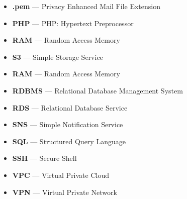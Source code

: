 \begin{itemize}
    \item  \textbf{.pem} \tab— Privacy Enhanced Mail File Extension
    \item  \textbf{PHP} \tab— PHP: Hypertext Preprocessor
    \item  \textbf{RAM} \tab— Random Access Memory
    \item  \textbf{S3} \tab— Simple Storage Service
    \item  \textbf{RAM} \tab— Random Access Memory
    \item  \textbf{RDBMS} \tab— Relational Database Management System
    \item  \textbf{RDS} \tab— Relational Database Service
    \item  \textbf{SNS} \tab— Simple Notification Service
    \item  \textbf{SQL} \tab— Structured Query Language
    \item  \textbf{SSH} \tab— Secure Shell
    \item  \textbf{VPC} \tab— Virtual Private Cloud
    \item  \textbf{VPN} \tab— Virtual Private Network
\end{itemize}